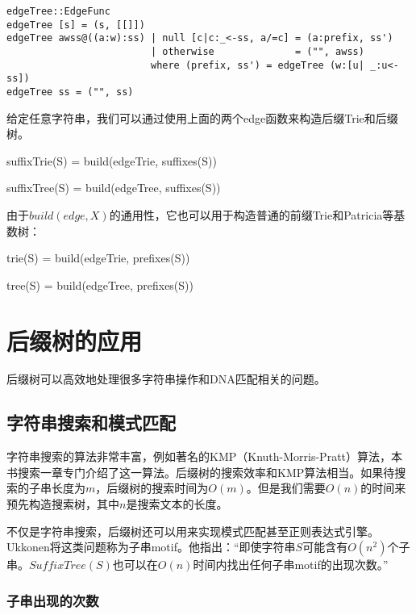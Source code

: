 \documentclass{ctexart}
\begin{document}
\begin{lstlisting}[style=Haskell]
edgeTree::EdgeFunc
edgeTree [s] = (s, [[]])
edgeTree awss@((a:w):ss) | null [c|c:_<-ss, a/=c] = (a:prefix, ss')
                         | otherwise              = ("", awss)
                         where (prefix, ss') = edgeTree (w:[u| _:u<-ss])
edgeTree ss = ("", ss)
\end{lstlisting}

给定任意字符串，我们可以通过使用上面的两个edge函数来构造后缀Trie和后缀树。

\be
suffixTrie(S) = build(edgeTrie, suffixes(S))
\ee

\be
suffixTree(S) = build(edgeTree, suffixes(S))
\ee

由于$build(edge, X)$的通用性，它也可以用于构造普通的前缀Trie和Patricia等基数树：

\be
trie(S) = build(edgeTrie, prefixes(S))
\ee

\be
tree(S) = build(edgeTree, prefixes(S))
\ee


\section{后缀树的应用}

后缀树可以高效地处理很多字符串操作和DNA匹配相关的问题。

\subsection{字符串搜索和模式匹配}
\label{substring-lookup}

字符串搜索的算法非常丰富，例如著名的KMP（Knuth-Morris-Pratt）算法，本书搜索一章专门介绍了这一算法。后缀树的搜索效率和KMP算法相当\cite{Gusfield-book}。如果待搜索的子串长度为$m$，后缀树的搜索时间为$O(m)$。但是我们需要$O(n)$的时间来预先构造搜索树，其中$n$是搜索文本的长度\cite{lallison-stree}。

不仅是字符串搜索，后缀树还可以用来实现模式匹配甚至正则表达式引擎。Ukkonen将这类问题称为子串motif。他指出：“即使字符串$S$可能含有$O(n^2)$个子串。$SuffixTree(S)$也可以在$O(n)$时间内找出任何子串motif的出现次数。”

\subsubsection{子串出现的次数}
\end{document}
